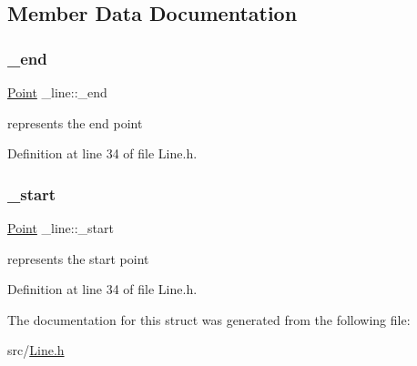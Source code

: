 \subsection{Member Data Documentation}
\mbox{\label{struct__line_a081e0006fa57d07bfb8ef30b5056a58a}} 
\subsubsection{\texorpdfstring{\_end}{\_end}}
{\footnotesize\ttfamily \mbox{\hyperlink{struct_point}{Point}} \+\_\+line\+::\+\_\+end}

represents the end point 

Definition at line 34 of file Line.\+h.

\mbox{\label{struct__line_a21249c64d9d4f9818059a9c99943df4b}} 
\subsubsection{\texorpdfstring{\_start}{\_start}}
{\footnotesize\ttfamily \mbox{\hyperlink{struct_point}{Point}} \+\_\+line\+::\+\_\+start}

represents the start point 

Definition at line 34 of file Line.\+h.



The documentation for this struct was generated from the following file\+:\begin{DoxyCompactItemize}
\item 
src/\mbox{\hyperlink{_line_8h}{Line.\+h}}\end{DoxyCompactItemize}
